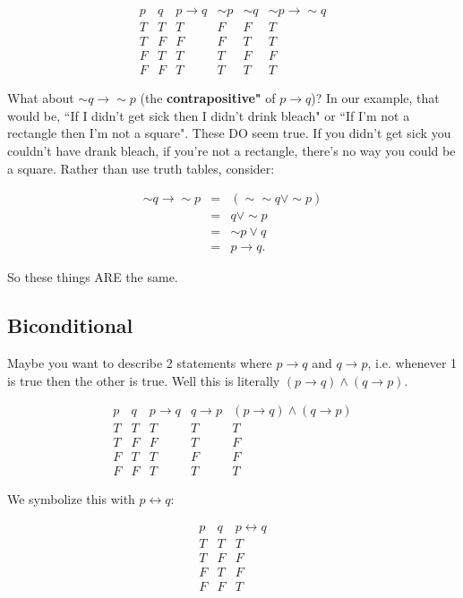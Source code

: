 $$\begin{array}{c|c|c|c|c|c}
p & q & p\to q &\sim p & \sim q& \sim p\to \sim q\\
\hline
T & T & T & F & F & T\\
T & F & F & F & T &T\\
F & T & T & T & F & F \\
F & F & T & T & T & T
\end{array}$$


What about $\sim q \to \sim p$ (the \textbf{ contrapositive"} of $p\to q$)?  In our example, that would be, ``If I didn't get sick then I didn't drink bleach" or ``If I'm not a rectangle then I'm not a square".  These DO seem true.  If you didn't get sick you couldn't have drank bleach, if you're not a rectangle, there's no way you could be a square.  Rather than use truth tables, consider:

\begin{eqnarray*}
\sim q \to \sim p&=&(\sim \sim q \vee \sim p)\\
&=&q \vee \sim p\\
&=&\sim p \vee q\\
&=&p\to q.
\end{eqnarray*}

So these things ARE the same.


\subsection{Biconditional}

Maybe you want to describe 2 statements where $p\to q$ and $q\to p$, i.e. whenever 1 is true then the other is true.  Well this is literally $(p\to q)\wedge (q\to p)$.



$$\begin{array}{c|c|c|c|c}
p & q & p\to q & q\to p& (p\to q)\wedge (q\to p)\\
\hline
T & T & T & T&T\\
T & F & F & T&F\\
F & T & T & F &F\\
F & F & T & T&T
\end{array}$$



We symbolize this with $p\leftrightarrow q:$



$$\begin{array}{c|c|c}
p & q & p\leftrightarrow q \\
\hline
T & T & T \\
T & F & F\\
F & T & F \\
F & F & T 
\end{array}$$



